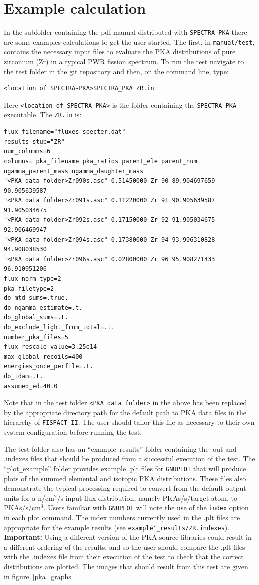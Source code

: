 \documentclass[a4paper]{article}
\begin{document}
\section{Example calculation}
In the subfolder containing the pdf manual distributed with \texttt{SPECTRA-PKA} there are some examples calculations to get the user started. The first, in \texttt{manual/test}, contains the necessary input files to evaluate the PKA distributions of pure zirconium (Zr) in a typical PWR fission spectrum. To run the test navigate to the test folder in the git repository and then, on the command line, type:
\begin{verbatim}
<location of SPECTRA-PKA>SPECTRA_PKA ZR.in
\end{verbatim}
Here \texttt{<location of SPECTRA-PKA>} is the folder containing the \texttt{SPECTRA-PKA} executable. The \texttt{ZR.in} is:
{\footnotesize
\begin{verbatim}
flux_filename="fluxes_specter.dat"
results_stub="ZR"
num_columns=6
columns= pka_filename pka_ratios parent_ele parent_num ngamma_parent_mass ngamma_daughter_mass
"<PKA data folder>Zr090s.asc" 0.51450000 Zr 90 89.904697659 90.905639587
"<PKA data folder>Zr091s.asc" 0.11220000 Zr 91 90.905639587 91.905034675
"<PKA data folder>Zr092s.asc" 0.17150000 Zr 92 91.905034675 92.906469947
"<PKA data folder>Zr094s.asc" 0.17380000 Zr 94 93.906310828 94.908038530
"<PKA data folder>Zr096s.asc" 0.02800000 Zr 96 95.908271433 96.910951206
flux_norm_type=2
pka_filetype=2
do_mtd_sums=.true.
do_ngamma_estimate=.t.
do_global_sums=.t.
do_exclude_light_from_total=.t.
number_pka_files=5
flux_rescale_value=3.25e14
max_global_recoils=400
energies_once_perfile=.t.
do_tdam=.t.
assumed_ed=40.0
\end{verbatim}}
Note that in the test folder \texttt{<PKA data folder>} in the above has been replaced by the appropriate directory path for the default path to PKA data files in the hierarchy of \texttt{FISPACT-II}. The user should tailor this file as necessary to their own system configuration before running the test.

The test folder also has an ``example\verb|_|results'' folder containing the .out and .indexes files that should be produced from a successful execution of the test. The ``plot\verb|_|example'' folder provides example .plt files for \texttt{GNUPLOT} that will produce plots of the summed elemental and isotopic PKA distributions. These files also demonstrate the typical processing required to convert from the default output units for a n/cm$^2$/s input flux distribution, namely PKAs/s/target-atom, to PKAs/s/cm$^3$. Users familiar with \texttt{GNUPLOT} will note the use of the \texttt{index} option in each plot command. The index numbers currently used in the .plt files are appropriate for the example results (see \texttt{example\char`_results/ZR.indexes}). \textbf{Important:} Using a different version of the PKA source libraries could result in a different ordering of the results, and so the user should compare the .plt files with the .indexes file from their execution of the test to check that the correct distributions are plotted. The images that should result from this test are given in figure~\ref{pka_graphs}.
\end{document}
